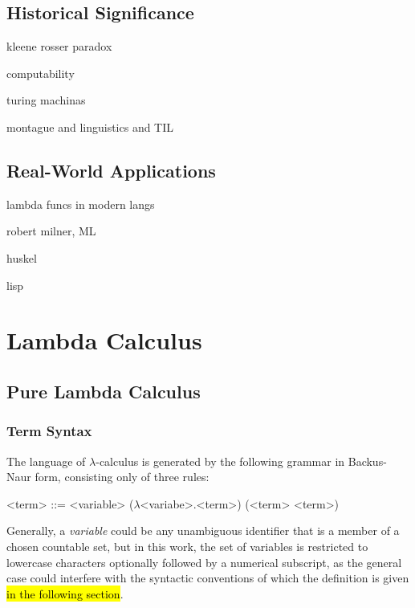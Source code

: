 \documentclass[a4paper,10pt]{article}
\begin{document}
\subsection{Historical Significance}
kleene rosser paradox

computability

turing machinas

montague and linguistics and TIL

\subsection{Real-World Applications}

lambda funcs in modern langs

robert milner, ML

huskel

lisp

\section{Lambda Calculus}

\subsection{Pure Lambda Calculus}

\subsubsection{Term Syntax}
The language of $\lambda$-calculus is generated by the following
grammar in Backus-Naur form, consisting only of three rules:
\setlength{\grammarindent}{5.2em}
\begin{grammar}
<term> ::= <variable> 
\alt ($\lambda$<variabe>.<term>) 
\alt (<term> <term>) 
\end{grammar}
Generally, a \textit{variable} could be any unambiguous identifier 
that is a member of a chosen countable set, but in this work, the set
of variables is restricted to
lowercase characters optionally followed by a numerical subscript,
as the general case could interfere with the syntactic conventions
of which the definition is given \hl{in the following section}.
\end{document}
